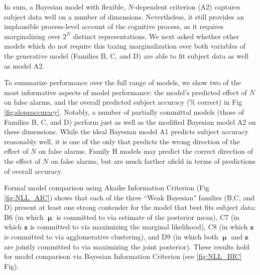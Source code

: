 \documentclass{article}
\newcommand{\mu}{\boldsymbol\upmu}
\begin{document}
In sum, a Bayesian model with flexible, $N$-dependent criterion (A2) captures subject data well on a number of dimensions. Nevertheless, it still provides an implausible process-level account of the cognitive process, as it requires marginalizing over $2^N$ distinct representations. We next asked whether other models which do not require this taxing marginalization over both variables of the generative model (Families B, C, and D) are able to fit subject data as well as model A2. 

To summarize performance over the full range of models, we show two of the most informative aspects of model performance: the model's predicted effect of $N$ on false alarms, and the overall predicted subject accuracy (\% correct) in Fig \ref{fig:slopeaccuracy}. Notably, a number of partially committal models (those of Families B, C, and D) perform just as well as the modified Bayesian model A2 on these dimensions. While the ideal Bayesian model A1 predicts subject accuracy reasonably well, it is one of the only that predicts the wrong direction of the effect of $N$ on false alarms. Family H models may predict the correct direction of the effect of $N$ on false alarms, but are much farther afield in terms of predictions of overall accuracy.

Formal model comparison using Akaike Information Criterion (Fig \ref{fig:NLL_AIC}) shows that each of the three ``Weak Bayesian" families (B,C, and D) present at least one strong contender for the model that best fits subject data: B6 (in which $\mu$ is committed to via estimate of the posterior mean), C7 (in which $\mathbf{z}$ is committed to via maximizing the marginal likelihood), C8 (in which  $\mathbf{z}$ is committed to via agglomerative clustering), and D9 (in which both $\mu$ and $\mathbf{z}$ are jointly committed to via maximizing the joint posterior). These results hold for model comparison via Bayesian Information Criterion (see \ref{fig:NLL_BIC} Fig).
\end{document}
